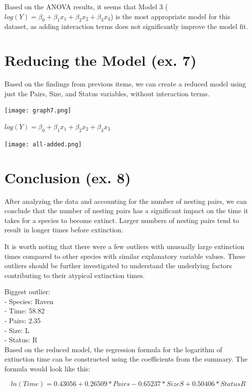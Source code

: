 \documentclass{article}
\begin{document}
Based on the ANOVA results, it seems that Model 3 ($log(Y) = \beta_0 + \beta_1 x_1 + \beta_2 x_2 + \beta_3 x_3$) is the most appropriate model for this dataset, as adding interaction terms does not significantly improve the model fit.


\section{Reducing the Model (ex. 7)}
Based on the findings from previous items, we can create a reduced model using just the Pairs, Size, and Status variables, without interaction terms.
\begin{center}
\texttt{[image: graph7.png]}
\end{center}
\begin{center}
$log(Y) = \beta_0 + \beta_1 x_1 + \beta_2 x_2 + \beta_3 x_3$
\end{center}
\texttt{[image: all-added.png]}


\section{Conclusion (ex. 8)}

After analyzing the data and accounting for the number of nesting pairs,
we can conclude that the number of nesting pairs has a significant
impact on the time it takes for a species to become extinct. Larger
numbers of nesting pairs tend to result in longer times before
extinction.

It is worth noting that there were a few outliers with unusually
large extinction times compared to other species with similar
explanatory variable values. These outliers should be further
investigated to understand the underlying factors contributing to their
atypical extinction times.

Biggest outlier: \\
- Species: Raven \\
- Time: 58.82 \\
- Pairs: 2.35 \\
- Size: L \\ 
- Status: R \\

Based on the reduced model, the regression formula for the
logarithm of extinction time can be constructed using the coefficients
from the summary. The formula would look like this:

$$ln(Time) = 0.43056 + 0.26509 * Pairs - 0.65237 * SizeS + 0.50406 *
StatusR$$
\end{document}
